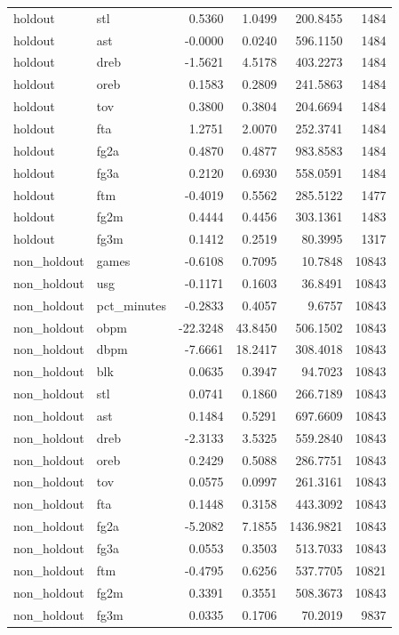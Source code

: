 \begin{table}
\begin{tabular}{llrrrr}
holdout & stl & 0.5360 & 1.0499 & 200.8455 & 1484 \\
holdout & ast & -0.0000 & 0.0240 & 596.1150 & 1484 \\
holdout & dreb & -1.5621 & 4.5178 & 403.2273 & 1484 \\
holdout & oreb & 0.1583 & 0.2809 & 241.5863 & 1484 \\
holdout & tov & 0.3800 & 0.3804 & 204.6694 & 1484 \\
holdout & fta & 1.2751 & 2.0070 & 252.3741 & 1484 \\
holdout & fg2a & 0.4870 & 0.4877 & 983.8583 & 1484 \\
holdout & fg3a & 0.2120 & 0.6930 & 558.0591 & 1484 \\
holdout & ftm & -0.4019 & 0.5562 & 285.5122 & 1477 \\
holdout & fg2m & 0.4444 & 0.4456 & 303.1361 & 1483 \\
holdout & fg3m & 0.1412 & 0.2519 & 80.3995 & 1317 \\
non\_holdout & games & -0.6108 & 0.7095 & 10.7848 & 10843 \\
non\_holdout & usg & -0.1171 & 0.1603 & 36.8491 & 10843 \\
non\_holdout & pct\_minutes & -0.2833 & 0.4057 & 9.6757 & 10843 \\
non\_holdout & obpm & -22.3248 & 43.8450 & 506.1502 & 10843 \\
non\_holdout & dbpm & -7.6661 & 18.2417 & 308.4018 & 10843 \\
non\_holdout & blk & 0.0635 & 0.3947 & 94.7023 & 10843 \\
non\_holdout & stl & 0.0741 & 0.1860 & 266.7189 & 10843 \\
non\_holdout & ast & 0.1484 & 0.5291 & 697.6609 & 10843 \\
non\_holdout & dreb & -2.3133 & 3.5325 & 559.2840 & 10843 \\
non\_holdout & oreb & 0.2429 & 0.5088 & 286.7751 & 10843 \\
non\_holdout & tov & 0.0575 & 0.0997 & 261.3161 & 10843 \\
non\_holdout & fta & 0.1448 & 0.3158 & 443.3092 & 10843 \\
non\_holdout & fg2a & -5.2082 & 7.1855 & 1436.9821 & 10843 \\
non\_holdout & fg3a & 0.0553 & 0.3503 & 513.7033 & 10843 \\
non\_holdout & ftm & -0.4795 & 0.6256 & 537.7705 & 10821 \\
non\_holdout & fg2m & 0.3391 & 0.3551 & 508.3673 & 10843 \\
non\_holdout & fg3m & 0.0335 & 0.1706 & 70.2019 & 9837 \\
\bottomrule
\end{tabular}
\end{table}
